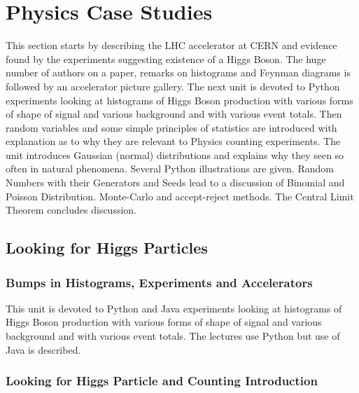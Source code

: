 

\chapter{Physics Case Studies}\label{physics-case-study}

\FILENAME

This section starts by describing the LHC accelerator at CERN and
evidence found by the experiments suggesting existence of a Higgs Boson.
The huge number of authors on a paper, remarks on histograms and Feynman
diagrams is followed by an accelerator picture gallery. The next unit is
devoted to Python experiments looking at histograms of Higgs Boson
production with various forms of shape of signal and various background
and with various event totals. Then random variables and some simple
principles of statistics are introduced with explanation as to why they
are relevant to Physics counting experiments. The unit introduces
Gaussian (normal) distributions and explains why they seen so often in
natural phenomena. Several Python illustrations are given. Random
Numbers with their Generators and Seeds lead to a discussion of Binomial
and Poisson Distribution. Monte-Carlo and accept-reject methods. The
Central Limit Theorem concludes discussion.

\section{Looking for Higgs Particles}

\subsection{Bumps in Histograms,  Experiments and Accelerators}

This unit is devoted to Python and Java experiments looking at
histograms of Higgs Boson production with various forms of shape of
signal and various background and with various event totals. The
lectures use Python but use of Java is described.




\subsection{Looking for Higgs Particle and Counting Introduction}

